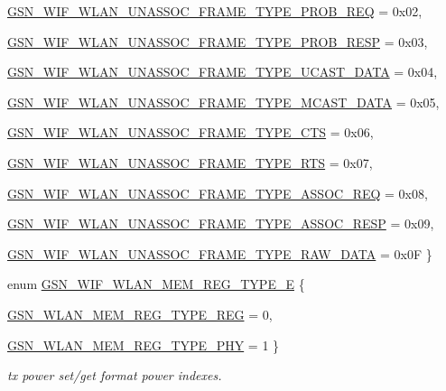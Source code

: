 \begin{DoxyCompactItemize}
\par
\hyperlink{a00677_ga1b471d184450287e7d0cec7c8d0c4639a14f107c01f736ddedcebff845ac17594}{GSN\_\-WIF\_\-WLAN\_\-UNASSOC\_\-FRAME\_\-TYPE\_\-PROB\_\-REQ} =  0x02, 
\par
\hyperlink{a00677_ga1b471d184450287e7d0cec7c8d0c4639aea63f6ae58aad67b3270c05bbefdc3c2}{GSN\_\-WIF\_\-WLAN\_\-UNASSOC\_\-FRAME\_\-TYPE\_\-PROB\_\-RESP} =  0x03, 
\par
\hyperlink{a00677_ga1b471d184450287e7d0cec7c8d0c4639a65dfdef0f47d5b5d7853f6aebffa050f}{GSN\_\-WIF\_\-WLAN\_\-UNASSOC\_\-FRAME\_\-TYPE\_\-UCAST\_\-DATA} =  0x04, 
\par
\hyperlink{a00677_ga1b471d184450287e7d0cec7c8d0c4639a47894d5ef4ea5c63d55071dd6dd530f7}{GSN\_\-WIF\_\-WLAN\_\-UNASSOC\_\-FRAME\_\-TYPE\_\-MCAST\_\-DATA} =  0x05, 
\par
\hyperlink{a00677_ga1b471d184450287e7d0cec7c8d0c4639a97eb3dc0c8c3ee43bbf0e33589f5c4db}{GSN\_\-WIF\_\-WLAN\_\-UNASSOC\_\-FRAME\_\-TYPE\_\-CTS} =  0x06, 
\par
\hyperlink{a00677_ga1b471d184450287e7d0cec7c8d0c4639a79093fed4376498349c129018d4768b7}{GSN\_\-WIF\_\-WLAN\_\-UNASSOC\_\-FRAME\_\-TYPE\_\-RTS} =  0x07, 
\par
\hyperlink{a00677_ga1b471d184450287e7d0cec7c8d0c4639ae39c218fa34351449d92015556136ff9}{GSN\_\-WIF\_\-WLAN\_\-UNASSOC\_\-FRAME\_\-TYPE\_\-ASSOC\_\-REQ} =  0x08, 
\par
\hyperlink{a00677_ga1b471d184450287e7d0cec7c8d0c4639ac3071712b6eb1e59af20aa583c922850}{GSN\_\-WIF\_\-WLAN\_\-UNASSOC\_\-FRAME\_\-TYPE\_\-ASSOC\_\-RESP} =  0x09, 
\par
\hyperlink{a00677_ga1b471d184450287e7d0cec7c8d0c4639a4af1fb914b96e09e325938e2a7e68d91}{GSN\_\-WIF\_\-WLAN\_\-UNASSOC\_\-FRAME\_\-TYPE\_\-RAW\_\-DATA} =  0x0F
 \}
\item 
enum \hyperlink{a00677_ga7f657dfcb65c6810c23ae68bbca0b101}{GSN\_\-WIF\_\-WLAN\_\-MEM\_\-REG\_\-TYPE\_\-E} \{ \par
\hyperlink{a00640_gga7f657dfcb65c6810c23ae68bbca0b101aba4ce9371ded92ab818bd48b24d1b74f}{GSN\_\-WLAN\_\-MEM\_\-REG\_\-TYPE\_\-REG} =  0, 
\par
\hyperlink{a00640_gga7f657dfcb65c6810c23ae68bbca0b101afd4788d7537c66f77185272b27a0479e}{GSN\_\-WLAN\_\-MEM\_\-REG\_\-TYPE\_\-PHY} =  1
 \}
\begin{DoxyCompactList}\small\item\em tx power set/get format power indexes. \end{DoxyCompactList}\item 

\end{DoxyCompactItemize}

